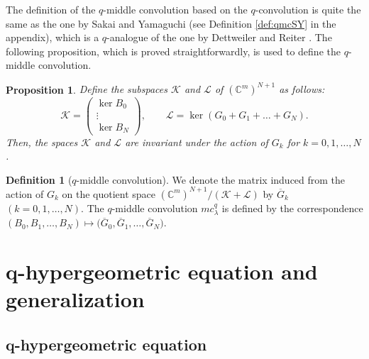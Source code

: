 \documentclass[pdftex]{sigma}
\numberwithin{equation}{section}
\newtheorem{Proposition}[Theorem]{Proposition}
\theoremstyle{definition}
\newtheorem{Definition}[Theorem]{Definition}
\begin{document}
The definition of the $q$-middle convolution based on the $q$-convolution is quite the same as the one by Sakai and Yamaguchi \cite{SY} (see Definition \ref{def:qmcSY} in the appendix), which is a $q$-analogue of the one by Dettweiler and Reiter \cite{DR1}.
The following proposition, which is proved straightforwardly, is used to define the $q$-middle convolution.
\begin{Proposition}
Define the subspaces $\mathcal{K}$ and $\mathcal{L} $ of $(\mathbb{C}^m )^{N+1}$ as follows:
\begin{equation}
 \mathcal{K} =
 \left(
 \begin{matrix}
 \operatorname{ker}B_0 \\
 \vdots \\
 \operatorname{ker}B_N
 \end{matrix}
 \right), \qquad
 \mathcal{L} = \operatorname{ker}(G_0 +G_1 + \dots + G_N ).
\label{eq:qKL}
\end{equation}
Then, the spaces $\mathcal{K}$ and $\mathcal{L} $ are invariant under the action of $G_k$ for $k=0 ,1, \dots ,N $.
\end{Proposition}
\begin{Definition}[$q$-middle convolution]\label{def:qmc}
We denote the matrix induced from the action of $G_k$ on the quotient space $(\mathbb{C}^m )^{N+1}/(\mathcal{K} + \mathcal{L})$ by $\overline{G}_k$ $(k=0 ,1, \dots ,N )$.
The $q$-middle convolution $mc ^q _\lambda$ is defined by the correspondence $ ( B_{0}, B_{1} ,\dots , B_N ) \mapsto \bigl( \overline{G}_{0}, \overline{G}_{1} ,\dots ,\overline{G}_N \bigr) $.
\end{Definition}

\section[q-hypergeometric equation and generalization]{$\boldsymbol{q}$-hypergeometric equation and generalization} \label{sec:qhypgeomgen}

\subsection[q-hypergeometric equation]{$\boldsymbol{q}$-hypergeometric equation} \label{sec:qconvex1}
\end{document}
